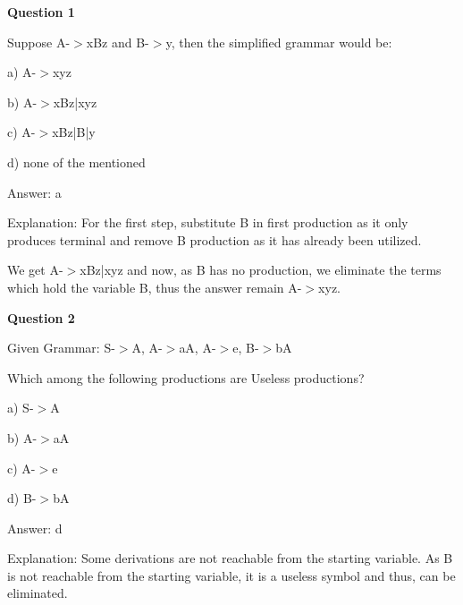 \documentclass{article}
\begin{document}
\begin{mdframed}[linewidth=1pt, roundcorner=5pt, linecolor=gray!30, backgroundcolor=gray!5]
\textbf{Question 1} 

Suppose A-$>$xBz and B-$>$y, then the simplified grammar would be:

a) A-$>$xyz

b) A-$>$xBz|xyz

c) A-$>$xBz|B|y

d) none of the mentioned
\vspace{5pt} \par
\begin{tcolorbox}[colback=green!5, colframe=green!40!black, title=Solution]
Answer: a

Explanation: For the first step, substitute B in first production as it only produces terminal and remove B production as it has already been utilized.

We get A-$>$xBz|xyz and now, as B has no production, we eliminate the terms which hold the variable B, thus the answer remain A-$>$xyz.
\end{tcolorbox}
\end{mdframed}

\begin{mdframed}[linewidth=1pt, roundcorner=5pt, linecolor=gray!30, backgroundcolor=gray!5]
\textbf{Question 2} 

Given Grammar: S-$>$A, A-$>$aA, A-$>$e, B-$>$bA

Which among the following productions are Useless productions?

a) S-$>$A

b) A-$>$aA

c) A-$>$e

d) B-$>$bA
\vspace{5pt} \par
\begin{tcolorbox}[colback=green!5, colframe=green!40!black, title=Solution]
Answer: d

Explanation: Some derivations are not reachable from the starting variable. As B is not reachable from the starting variable, it is a useless symbol and thus, can be eliminated.
\end{tcolorbox}
\end{mdframed}
\end{document}
